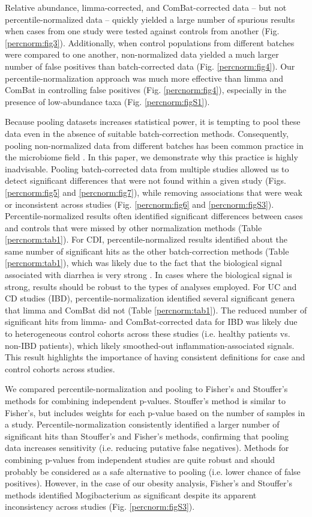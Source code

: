 Relative abundance, limma-corrected, and ComBat-corrected data -- but not percentile-normalized data -- quickly yielded a large number of spurious results when cases from one study were tested against controls from another (Fig. \ref{percnorm:fig3}).
Additionally, when control populations from different batches were compared to one another, non-normalized data yielded a much larger number of false positives than batch-corrected data (Fig. \ref{percnorm:fig4}).
Our percentile-normalization approach was much more effective than limma and ComBat in controlling false positives (Fig. \ref{percnorm:fig4}), especially in the presence of low-abundance taxa (Fig. \ref{percnorm:figS1}).

Because pooling datasets increases statistical power, it is tempting to pool these data even in the absence of suitable batch-correction methods.
Consequently, pooling non-normalized data from different batches has been common practice in the microbiome field \cite{27,29,35,47--55}.
In this paper, we demonstrate why this practice is highly inadvisable.
Pooling batch-corrected data from multiple studies allowed us to detect significant differences that were not found within a given study (Figs. \ref{percnorm:fig5} and \ref{percnorm:fig7}), while removing associations that were weak or inconsistent across studies (Fig. \ref{percnorm:fig6} and \ref{percnorm:figS3}).
Percentile-normalized results often identified significant differences between cases and controls that were missed by other normalization methods (Table \ref{percnorm:tab1}).
For CDI, percentile-normalized results identified about the same number of significant hits as the other batch-correction methods (Table \ref{percnorm:tab1}), which was likely due to the fact that the biological signal associated with diarrhea is very strong \cite{17}.
In cases where the biological signal is strong, results should be robust to the types of analyses employed.
For UC and CD studies (IBD), percentile-normalization identified several significant genera that limma and ComBat did not (Table \ref{percnorm:tab1}).
The reduced number of significant hits from limma- and ComBat-corrected data for IBD was likely due to heterogeneous control cohorts across these studies (i.e. healthy patients vs. non-IBD patients), which likely smoothed-out inflammation-associated signals.
This result highlights the importance of having consistent definitions for case and control cohorts across studies.

We compared percentile-normalization and pooling to Fisher's and Stouffer's methods for combining independent p-values.
Stouffer's method is similar to Fisher's, but includes weights for each p-value based on the number of samples in a study.
Percentile-normalization consistently identified a larger number of significant hits than Stouffer's and Fisher's methods, confirming that pooling data increases sensitivity (i.e. reducing putative false negatives).
Methods for combining p-values from independent studies are quite robust and should probably be considered as a safe alternative to pooling (i.e. lower chance of false positives).
However, in the case of our obesity analysis, Fisher's and Stouffer's methods identified Mogibacterium as significant despite its apparent inconsistency across studies (Fig. \ref{percnorm:figS3}).

